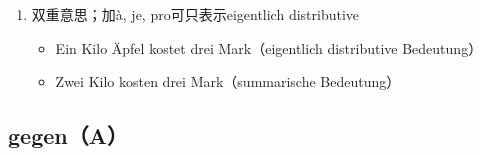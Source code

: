 \documentclass[UTF8]{report}
\begin{document}
\begin{enumerate}
    \begin{enumerate}
        \item 双重意思；加à, je, pro可只表示eigentlich distributive
        \begin{itemize}
            \item Ein Kilo Äpfel kostet drei Mark（eigentlich distributive Bedeutung）
            \item Zwei Kilo kosten drei Mark（summarische Bedeutung）
        \end{itemize}
    \end{enumerate}
\end{enumerate}

\subsection{gegen（A）}
\end{document}
